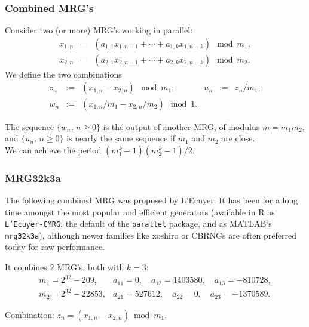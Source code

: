 \documentclass[aspectratio=169]{beamer}
\def\red{\color{red}}
\begin{document}
	\begin{frame}
		\frametitle{Combined MRG's}
		
		Consider two (or more) MRG's working in parallel:
		\begin{eqnarray*}
			x_{1,n} &=& (a_{1,1} x_{1,n-1} + \cdots + a_{1,k} x_{1,n-k}) \mod m_1,\\
			x_{2,n} &=& (a_{2,1} x_{2,n-1} + \cdots + a_{2,k} x_{2,n-k}) \mod m_2.
		\end{eqnarray*}
		We define the two {\red combinations}
		$$
		\begin {array}{rclrcl}
		z_n &:=& (x_{1,n} - x_{2,n}) \mod m_1; &
		{u_n} &:=& z_n/m_1; \\
		{w_n} &:=& (x_{1,n}/m_1 - x_{2,n}/m_2) \mod 1.
		\end {array}
		$$
		
		\mbox{}
		
		The sequence ${\{w_n,\, n\ge 0\}}$ is the output of another MRG, of
		modulus ${m} = m_1 m_2$, and ${\{u_n,\, n\ge 0\}}$ is nearly the same
		sequence if $m_1$ and $m_2$ are close.\\
		We can achieve the period $(m_1^k-1)(m_2^k-1)/2$.
		
	\end{frame}
	
	\begin{frame}
		\frametitle{MRG32k3a}
		
		The following combined MRG was proposed by L'Ecuyer. It has been for a long time
		amongst the most popular and efficient generators (available in R as
		\texttt{L'Ecuyer-CMRG}, the default of the \texttt{parallel} package, and as
		MATLAB's \texttt{mrg32k3a}), although newer families like xoshiro or CBRNGs are
		often preferred today for raw performance.
		
		\medskip
		
		It combines 2 MRG's, both with $k=3$:
		\[
		\begin{array}{ll}
		m_1 = 2^{32}-209, & a_{11} = 0,\quad a_{12} = 1403580,\quad a_{13} = -810728,\\[2pt]
		m_2 = 2^{32}-22853, & a_{21} = 527612,\quad a_{22} = 0,\quad a_{23} = -1370589.
		\end{array}
		\]
		
		\medskip
		
		Combination: $z_n = (x_{1,n} - x_{2,n}) \bmod m_1$.
	\end{frame}
	
\end{document}
